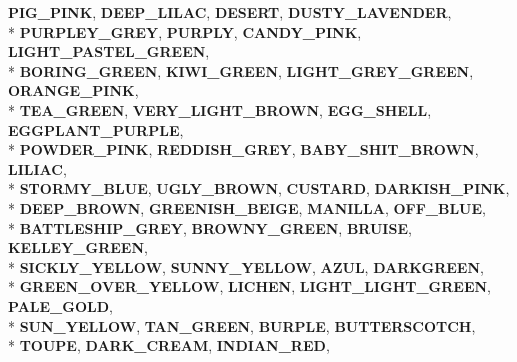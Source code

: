 \begin{DoxyCompactItemize}
{\bfseries P\+I\+G\+\_\+\+P\+I\+NK}, 
{\bfseries D\+E\+E\+P\+\_\+\+L\+I\+L\+AC}, 
{\bfseries D\+E\+S\+E\+RT}, 
{\bfseries D\+U\+S\+T\+Y\+\_\+\+L\+A\+V\+E\+N\+D\+ER}, 
\\*
{\bfseries P\+U\+R\+P\+L\+E\+Y\+\_\+\+G\+R\+EY}, 
{\bfseries P\+U\+R\+P\+LY}, 
{\bfseries C\+A\+N\+D\+Y\+\_\+\+P\+I\+NK}, 
{\bfseries L\+I\+G\+H\+T\+\_\+\+P\+A\+S\+T\+E\+L\+\_\+\+G\+R\+E\+EN}, 
\\*
{\bfseries B\+O\+R\+I\+N\+G\+\_\+\+G\+R\+E\+EN}, 
{\bfseries K\+I\+W\+I\+\_\+\+G\+R\+E\+EN}, 
{\bfseries L\+I\+G\+H\+T\+\_\+\+G\+R\+E\+Y\+\_\+\+G\+R\+E\+EN}, 
{\bfseries O\+R\+A\+N\+G\+E\+\_\+\+P\+I\+NK}, 
\\*
{\bfseries T\+E\+A\+\_\+\+G\+R\+E\+EN}, 
{\bfseries V\+E\+R\+Y\+\_\+\+L\+I\+G\+H\+T\+\_\+\+B\+R\+O\+WN}, 
{\bfseries E\+G\+G\+\_\+\+S\+H\+E\+LL}, 
{\bfseries E\+G\+G\+P\+L\+A\+N\+T\+\_\+\+P\+U\+R\+P\+LE}, 
\\*
{\bfseries P\+O\+W\+D\+E\+R\+\_\+\+P\+I\+NK}, 
{\bfseries R\+E\+D\+D\+I\+S\+H\+\_\+\+G\+R\+EY}, 
{\bfseries B\+A\+B\+Y\+\_\+\+S\+H\+I\+T\+\_\+\+B\+R\+O\+WN}, 
{\bfseries L\+I\+L\+I\+AC}, 
\\*
{\bfseries S\+T\+O\+R\+M\+Y\+\_\+\+B\+L\+UE}, 
{\bfseries U\+G\+L\+Y\+\_\+\+B\+R\+O\+WN}, 
{\bfseries C\+U\+S\+T\+A\+RD}, 
{\bfseries D\+A\+R\+K\+I\+S\+H\+\_\+\+P\+I\+NK}, 
\\*
{\bfseries D\+E\+E\+P\+\_\+\+B\+R\+O\+WN}, 
{\bfseries G\+R\+E\+E\+N\+I\+S\+H\+\_\+\+B\+E\+I\+GE}, 
{\bfseries M\+A\+N\+I\+L\+LA}, 
{\bfseries O\+F\+F\+\_\+\+B\+L\+UE}, 
\\*
{\bfseries B\+A\+T\+T\+L\+E\+S\+H\+I\+P\+\_\+\+G\+R\+EY}, 
{\bfseries B\+R\+O\+W\+N\+Y\+\_\+\+G\+R\+E\+EN}, 
{\bfseries B\+R\+U\+I\+SE}, 
{\bfseries K\+E\+L\+L\+E\+Y\+\_\+\+G\+R\+E\+EN}, 
\\*
{\bfseries S\+I\+C\+K\+L\+Y\+\_\+\+Y\+E\+L\+L\+OW}, 
{\bfseries S\+U\+N\+N\+Y\+\_\+\+Y\+E\+L\+L\+OW}, 
{\bfseries A\+Z\+UL}, 
{\bfseries D\+A\+R\+K\+G\+R\+E\+EN}, 
\\*
{\bfseries G\+R\+E\+E\+N\+\_\+\+O\+V\+E\+R\+\_\+\+Y\+E\+L\+L\+OW}, 
{\bfseries L\+I\+C\+H\+EN}, 
{\bfseries L\+I\+G\+H\+T\+\_\+\+L\+I\+G\+H\+T\+\_\+\+G\+R\+E\+EN}, 
{\bfseries P\+A\+L\+E\+\_\+\+G\+O\+LD}, 
\\*
{\bfseries S\+U\+N\+\_\+\+Y\+E\+L\+L\+OW}, 
{\bfseries T\+A\+N\+\_\+\+G\+R\+E\+EN}, 
{\bfseries B\+U\+R\+P\+LE}, 
{\bfseries B\+U\+T\+T\+E\+R\+S\+C\+O\+T\+CH}, 
\\*
{\bfseries T\+O\+U\+PE}, 
{\bfseries D\+A\+R\+K\+\_\+\+C\+R\+E\+AM}, 
{\bfseries I\+N\+D\+I\+A\+N\+\_\+\+R\+ED}, 

\end{DoxyCompactItemize}
